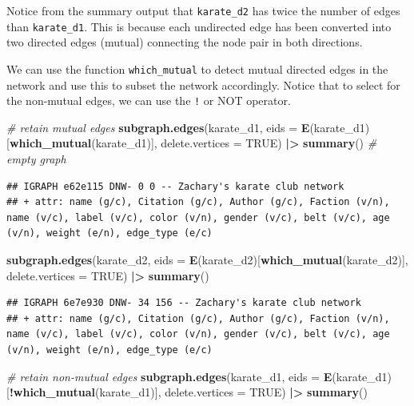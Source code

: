 \documentclass[
]{book}
\newenvironment{Shaded}{\begin{snugshade}}{\end{snugshade}}
\newcommand{\AttributeTok}[1]{\textcolor[rgb]{0.13,0.29,0.53}{#1}}
\newcommand{\CommentTok}[1]{\textcolor[rgb]{0.56,0.35,0.01}{\textit{#1}}}
\newcommand{\ConstantTok}[1]{\textcolor[rgb]{0.56,0.35,0.01}{#1}}
\newcommand{\FunctionTok}[1]{\textcolor[rgb]{0.13,0.29,0.53}{\textbf{#1}}}
\newcommand{\NormalTok}[1]{#1}
\newcommand{\SpecialCharTok}[1]{\textcolor[rgb]{0.81,0.36,0.00}{\textbf{#1}}}
\begin{document}
Notice from the summary output that \texttt{karate\_d2} has twice the number of edges than \texttt{karate\_d1}. This is because each undirected edge has been converted into two directed edges (mutual) connecting the node pair in both directions.

We can use the function \texttt{which\_mutual} to detect mutual directed edges in the network and use this to subset the network accordingly. Notice that to select for the non-mutual edges, we can use the \texttt{!} or NOT operator.

\begin{Shaded}
\begin{Highlighting}[]
\CommentTok{\# retain mutual edges }
\FunctionTok{subgraph.edges}\NormalTok{(karate\_d1, }\AttributeTok{eids =} \FunctionTok{E}\NormalTok{(karate\_d1)[}\FunctionTok{which\_mutual}\NormalTok{(karate\_d1)], }\AttributeTok{delete.vertices =} \ConstantTok{TRUE}\NormalTok{) }\SpecialCharTok{|\textgreater{}} 
  \FunctionTok{summary}\NormalTok{() }\CommentTok{\# empty graph}
\end{Highlighting}
\end{Shaded}

\begin{verbatim}
## IGRAPH e62e115 DNW- 0 0 -- Zachary's karate club network
## + attr: name (g/c), Citation (g/c), Author (g/c), Faction (v/n), name (v/c), label (v/c), color (v/n), gender (v/c), belt (v/c), age (v/n), weight (e/n), edge_type (e/c)
\end{verbatim}

\begin{Shaded}
\begin{Highlighting}[]
\FunctionTok{subgraph.edges}\NormalTok{(karate\_d2, }\AttributeTok{eids =} \FunctionTok{E}\NormalTok{(karate\_d2)[}\FunctionTok{which\_mutual}\NormalTok{(karate\_d2)], }\AttributeTok{delete.vertices =} \ConstantTok{TRUE}\NormalTok{) }\SpecialCharTok{|\textgreater{}} 
  \FunctionTok{summary}\NormalTok{()}
\end{Highlighting}
\end{Shaded}

\begin{verbatim}
## IGRAPH 6e7e930 DNW- 34 156 -- Zachary's karate club network
## + attr: name (g/c), Citation (g/c), Author (g/c), Faction (v/n), name (v/c), label (v/c), color (v/n), gender (v/c), belt (v/c), age (v/n), weight (e/n), edge_type (e/c)
\end{verbatim}

\begin{Shaded}
\begin{Highlighting}[]
\CommentTok{\# retain non{-}mutual edges }
\FunctionTok{subgraph.edges}\NormalTok{(karate\_d1, }\AttributeTok{eids =} \FunctionTok{E}\NormalTok{(karate\_d1)[}\SpecialCharTok{!}\FunctionTok{which\_mutual}\NormalTok{(karate\_d1)], }\AttributeTok{delete.vertices =} \ConstantTok{TRUE}\NormalTok{) }\SpecialCharTok{|\textgreater{}} 
  \FunctionTok{summary}\NormalTok{()}
\end{Highlighting}
\end{Shaded}
\end{document}

